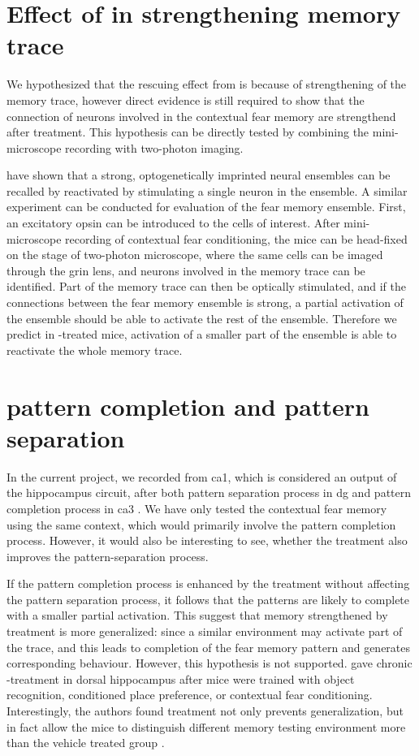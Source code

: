 \section{Effect of \tglu in strengthening memory trace}

We hypothesized that the rescuing effect from \tglu is because of strengthening of the memory trace, however direct evidence is still required to show that the connection of neurons involved in the contextual fear memory are strengthend after \tglu treatment. This hypothesis can be directly tested by combining the mini-microscope recording with two-photon imaging. 

\citet{carrillo-reid16} have shown that a strong, optogenetically imprinted neural ensembles can be recalled by reactivated by stimulating a single neuron in the ensemble. A similar experiment can be conducted for evaluation of the fear memory ensemble. First, an excitatory opsin can be introduced to the cells of interest. After mini-microscope recording of contextual fear conditioning, the mice can be head-fixed on the stage of two-photon microscope, where the same cells can be imaged through the \gls{grin} lens, and neurons involved in the memory trace can be identified. Part of the memory trace can then be optically stimulated, and if the connections between the fear memory ensemble is strong, a partial activation of the ensemble should be able to activate the rest of the ensemble. Therefore we predict in \tglu-treated mice, activation of a smaller part of the ensemble is able to reactivate the whole memory trace. 

\section{pattern completion and pattern separation}

In the current project, we recorded from \gls{ca1}, which is considered an output of the hippocampus circuit, after both pattern separation process in \gls{dg} and pattern completion process in \gls{ca3} . We have only tested the contextual fear memory using the same context, which would primarily involve the pattern completion process. However, it would also be interesting to see, whether the \tglu treatment also improves the pattern-separation process. 

If the pattern completion process is enhanced by the \tglu treatment without affecting the pattern separation process, it follows that the patterns are likely to complete with a smaller partial activation. This suggest that memory strengthened by \tglu treatment is more generalized: since a similar environment may activate part of the trace, and this leads to completion of the fear memory pattern and generates corresponding behaviour. However, this hypothesis is not supported. \citet{migues16} gave chronic \tglu-treatment in dorsal hippocampus after mice were trained with object recognition, conditioned place preference, or contextual fear conditioning. Interestingly, the authors found \tglu treatment not only prevents generalization, but in fact allow the mice to distinguish different memory testing environment more than the vehicle treated group \citep{migues16}. 

